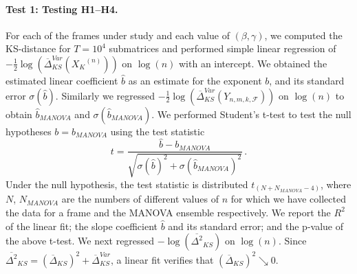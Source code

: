 \documentclass[a4paper,12pt]{article}
\newcommand{\TODO}[1]{ {\tt \color{red} [TODO:#1] } }
\newcommand{\V}[1]{\ensuremath{\mathbf{#1}}}
\newcommand{\Fc}{\ensuremath{\mathcal{F}}}
\newcommand{\m}{m}
\newcommand{\norm}[1]{\left|\left| #1 \right|\right|}
\newcommand{\Xk}{\ensuremath{X_K}}
\begin{document}
\paragraph{Test 1: Testing H1--H4.}
For each of the frames under study and each value of $(\beta,\gamma)$, we computed the KS-distance for $T=10^4$
submatrices and performed simple linear regression
of 
$-\frac{1}{2}\log\left( \overline{\Delta}^{Var}_{KS}(\Xk^{(n)})\right)$ 
on $\log(n)$ with an intercept. We obtained 
the estimated linear coefficient $\hat{b}$ as an estimate
for the exponent $b$, and its standard error $\sigma(\hat{b})$.
Similarly we regressed 
$-\frac{1}{2}\log\left( 
\overline{\Delta}^{Var}_{KS}(Y_{n,\m,k,\Fc})\right)$
on $\log(n)$ to obtain $\hat{b}_{MANOVA}$ and $\sigma(\hat{b}_{MANOVA})$.  
We performed Student's
t-test to test the null hypotheses $b=b_{MANOVA}$ using
the test
statistic 
\[
t = \frac{\hat{b}-b_{MANOVA}}
{\sqrt{\sigma(\hat{b})^2+\sigma(\hat{b}_{MANOVA})^2 }}\,.
\]
Under the null hypothesis, 
the test statistic is distributed $t_{(N+N_{MANOVA}-4)}$, %
where $N$, $N_{MANOVA}$ are the numbers of different values of $n$ for which we have collected
the data for a frame and the MANOVA ensemble respectively.
We report the $R^2$ of
the linear fit; the slope coefficient $\hat{b}$ and its standard error; and the
p-value of the above t-test.
We next regressed $-\log \left(\overline{\Delta^2}_{KS}\right)$ on $\log(n)$. 
Since $\overline{\Delta^2}_{KS} = \left( \overline{\Delta}_{KS}
\right)^2+\overline{\Delta}_{KS}^{Var}$, a linear fit verifies that 
$ \left( \overline{\Delta}_{KS}
\right)^2 \searrow 0$.

\end{document}
